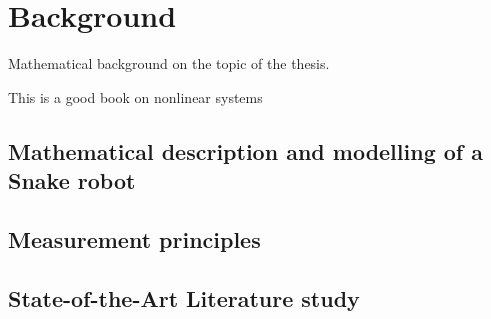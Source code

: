 

\chapter{Background}
Mathematical background on the topic of the thesis.

This is a good book on nonlinear systems \cite{ulin}

\section{Mathematical description and modelling of a Snake robot}



\section{Measurement principles}



\section{State-of-the-Art Literature study}


